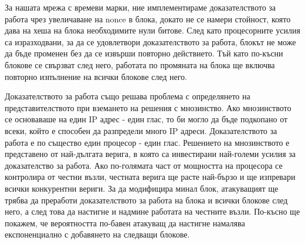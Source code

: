 \documentclass[11pt,a4paper]{article}
\begin{document}
За нашата мрежа с времеви марки, ние имплементираме доказателството за работа чрез увеличаване на nonce в блока, докато не се намери стойност, която дава на хеша на блока необходимите нули битове. След като процесорните усилия са изразходвани, за да се удовлетвори доказателството за работа, блокът не може да бъде променен без да се извърши повторно действието. Тъй като по-късни блокове се свързват след него, работата по промяната на блока ще включва повторно изпълнение на всички блокове след него.

\begin{center}
\end{center}

Доказателството за работа също решава проблема с определянето на представителството при вземането на решения с мнозинство. Ако мнозинството се основаваше на един IP адрес - един глас, то би могло да бъде подкопано от всеки, който е способен да разпредели много IP адреси. Доказателството за работа е по същество един процесор - един глас. Решението на мнозинството е представено от най-дългата верига, в която са инвестирани най-големи усилия за доказателство за работа. Ако по-голямата част от мощността на процесора се контролира от честни възли, честната верига ще расте най-бързо и ще изпревари всички конкурентни вериги. За да модифицира минал блок, атакуващият ще трябва да преработи доказателството за работа на блока и всички блокове след него, а след това да настигне и надмине работата на честните възли. По-късно ще покажем, че вероятността по-бавен атакуващ да настигне намалява експоненциално с добавянето на следващи блокове.
\end{document}
